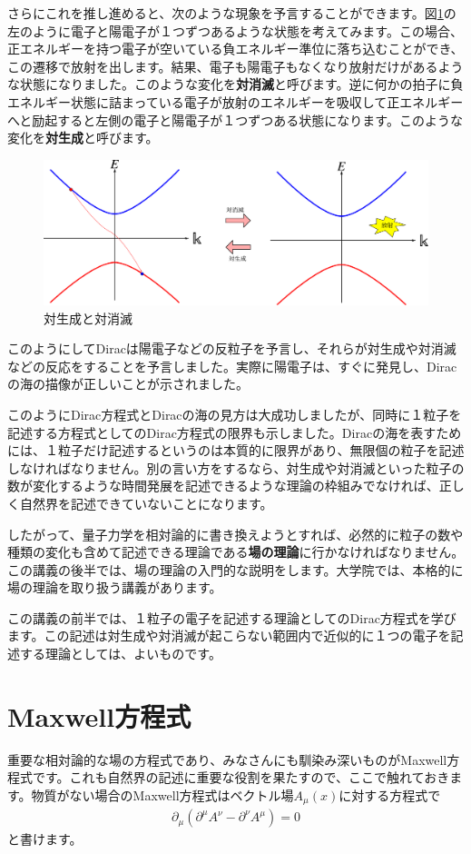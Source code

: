 \documentclass[report,paper=a4, fontsize=12pt, line_length=16cm, number_of_lines=33,dvipdfmx]{jlreq}
\numberwithin{equation}{chapter}
\newcommand{\del}{\partial}
\newcommand{\strong}[1]{{\sffamily \bfseries #1}}
\begin{document}
さらにこれを推し進めると、次のような現象を予言することができます。図\ref{fig:paircreation}の左のように電子と陽電子が１つずつあるような状態を考えてみます。この場合、正エネルギーを持つ電子が空いている負エネルギー準位に落ち込むことができ、この遷移で放射を出します。結果、電子も陽電子もなくなり放射だけがあるような状態になりました。このような変化を\strong{対消滅}と呼びます。逆に何かの拍子に負エネルギー状態に詰まっている電子が放射のエネルギーを吸収して正エネルギーへと励起すると左側の電子と陽電子が１つずつある状態になります。このような変化を\strong{対生成}と呼びます。
\begin{figure}[htbp]
  \centering
  \includegraphics[width=14cm]{paircreation.pdf}
  \caption{対生成と対消滅}
  \label{fig:paircreation}
\end{figure}

このようにしてDiracは陽電子などの反粒子を予言し、それらが対生成や対消滅などの反応をすることを予言しました。実際に陽電子は、すぐに発見し、Diracの海の描像が正しいことが示されました。

このようにDirac方程式とDiracの海の見方は大成功しましたが、同時に１粒子を記述する方程式としてのDirac方程式の限界も示しました。Diracの海を表すためには、１粒子だけ記述するというのは本質的に限界があり、無限個の粒子を記述しなければなりません。別の言い方をするなら、対生成や対消滅といった粒子の数が変化するような時間発展を記述できるような理論の枠組みでなければ、正しく自然界を記述できていないことになります。

したがって、量子力学を相対論的に書き換えようとすれば、必然的に粒子の数や種類の変化も含めて記述できる理論である\strong{場の理論}に行かなければなりません。この講義の後半では、場の理論の入門的な説明をします。大学院では、本格的に場の理論を取り扱う講義があります。

この講義の前半では、１粒子の電子を記述する理論としてのDirac方程式を学びます。この記述は対生成や対消滅が起こらない範囲内で近似的に１つの電子を記述する理論としては、よいものです。

\section{Maxwell方程式}
重要な相対論的な場の方程式であり、みなさんにも馴染み深いものがMaxwell方程式です。これも自然界の記述に重要な役割を果たすので、ここで触れておきます。物質がない場合のMaxwell方程式はベクトル場$A_{\mu}(x)$に対する方程式で
\begin{align}
  \del_{\mu}(\del^{\mu}A^{\nu}-\del^{\nu}A^{\mu})=0
\end{align}
と書けます。
\end{document}
